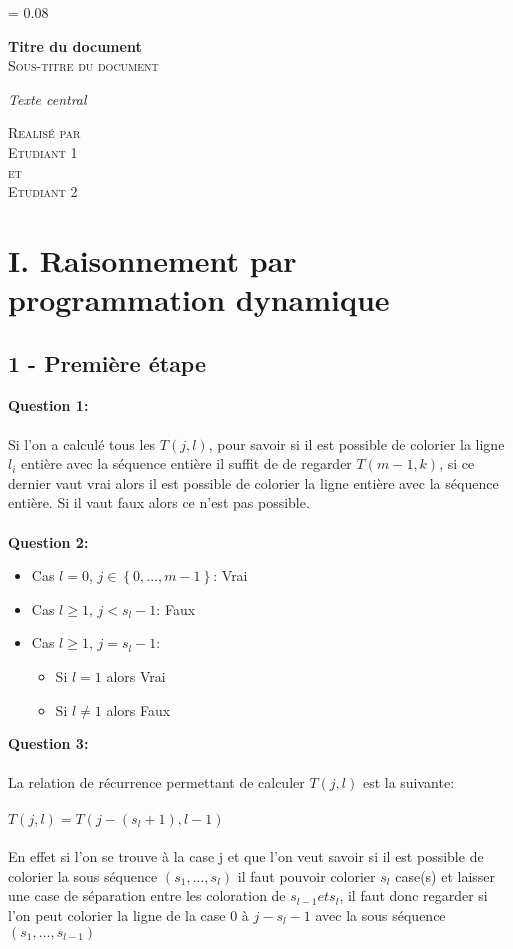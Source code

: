 \documentclass[a4paper]{memoir}
\newlength{\drop}
\newcommand*{\titleM}{\begingroup %
\drop = 0.08\textheight
\centering
\vspace*{\drop}

{\Huge\bfseries Titre du document}\\[\baselineskip]

{\large\scshape Sous-titre du document}\\[\baselineskip]

\begin{vplace}[0.7]
    \textit{Texte central}
\end{vplace}

{\scshape Realisé par\\ Etudiant 1\\ et\\ Etudiant 2}\par

\vspace*{2\drop}
\endgroup}
\begin{document}
    \begin{center}
    \titleM 
    \end{center}
    \clearpage
    
    \begin{center}
    \tableofcontents
    \end{center}
    
    \newpage
    
    \section{I. Raisonnement par programmation dynamique}
    \subsection{1 - Première étape}
    \textbf{Question 1:}\\\\ Si l’on a calculé tous les $T(j, l)$, pour savoir si il est possible de colorier la ligne $l_{i}$ entière avec la séquence entière  il suffit de de regarder $T(m-1, k)$, si ce dernier vaut vrai alors il est possible de colorier la ligne entière avec la séquence entière. Si il vaut faux alors ce n'est pas possible.\\\\
    \textbf{Question 2:}
    \begin{itemize}
		\item Cas $l = 0$, $j\in{\left\lbrace 0,...,m-1 \right\rbrace }$: Vrai
		\item Cas $l \geqslant 1$, $j < s_{l}-1$: Faux
		\item Cas $l \geqslant 1$, $j = s_{l}-1$:
		\begin{itemize}
			\item Si $l = 1$ alors Vrai 
			\item Si $l \neq 1$ alors Faux
		\end{itemize}
	\end{itemize}
 	
 	\textbf{Question 3:}\\\\
 	La relation de récurrence permettant de calculer $T(j,l)$ est la suivante:\\\\
 	$T(j, l) = T(j-(s_{l}+1),l-1)$\\\\
 	En effet si l'on se trouve à la case j et que l'on veut savoir si il est possible de colorier la sous séquence $(s_{1}, ..., s_{l})$ il faut pouvoir colorier $s_{l}$ case(s) et laisser une case de séparation entre les coloration de $s_{l-1} et s_{l}$, il faut donc regarder si l'on peut colorier la ligne de la case 0 à $j - s_{l} - 1$ avec la sous séquence $(s_{1}, ..., s_{l-1})$
\end{document}
